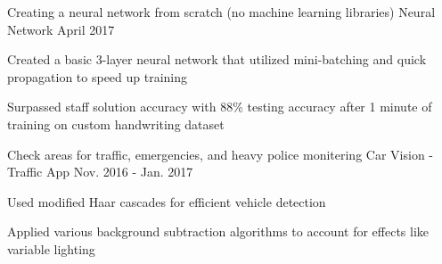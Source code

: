 

\begin{cventries}

  \cventry
    {Creating a neural network from scratch (no machine learning libraries)} %
    {Neural Network} %
    {} %
    {April 2017} %
    {
      \begin{cvitems} %
        \item {Created a basic 3-layer neural network that utilized mini-batching and quick propagation to speed up training}
        \item {Surpassed staff solution accuracy with 88\% testing accuracy after 1 minute of training on custom handwriting dataset}
      \end{cvitems}
    }
  \cventry
    {Check areas for traffic, emergencies, and heavy police monitering} %
    {Car Vision - Traffic App} %
    {} %
    {Nov. 2016 - Jan. 2017} %
    {
      \begin{cvitems} %
        \item {Used modified Haar cascades for efficient vehicle detection}
        \item {Applied various background subtraction algorithms to account for effects like variable lighting}
      \end{cvitems}
    }

\end{cventries}
